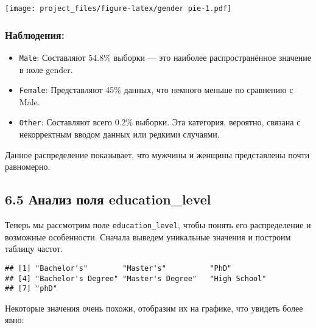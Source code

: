 \documentclass[
]{article}
\newenvironment{Shaded}{\begin{snugshade}}{\end{snugshade}}
\newcommand{\FunctionTok}[1]{\textcolor[rgb]{0.13,0.29,0.53}{\textbf{#1}}}
\newcommand{\NormalTok}[1]{#1}
\newcommand{\SpecialCharTok}[1]{\textcolor[rgb]{0.81,0.36,0.00}{\textbf{#1}}}
\providecommand{\tightlist}{%
  \setlength{\itemsep}{0pt}\setlength{\parskip}{0pt}}
\begin{document}
\texttt{[image: project\_files/figure-latex/gender pie-1.pdf]}

\subsubsection{Наблюдения:}\label{ux43dux430ux431ux43bux44eux434ux435ux43dux438ux44f-4}

\begin{itemize}
\tightlist
\item
  \texttt{Male}: Составляют 54.8\% выборки --- это наиболее
  распространённое значение в поле gender.
\item
  \texttt{Female}: Представляют 45\% данных, что немного меньше по
  сравнению с Male.
\item
  \texttt{Other}: Составляют всего 0.2\% выборки. Эта категория,
  вероятно, связана с некорректным вводом данных или редкими случаями.
\end{itemize}

Данное распределение показывает, что мужчины и женщины представлены
почти равномерно.

\subsection{6.5 Анализ поля
education\_level}\label{ux430ux43dux430ux43bux438ux437-ux43fux43eux43bux44f-education_level}

Теперь мы рассмотрим поле \texttt{education\_level}, чтобы понять его
распределение и возможные особенности. Сначала выведем уникальные
значения и построим таблицу частот.

\begin{Shaded}
\end{Shaded}

\begin{verbatim}
## [1] "Bachelor's"        "Master's"          "PhD"              
## [4] "Bachelor's Degree" "Master's Degree"   "High School"      
## [7] "phD"
\end{verbatim}

Некоторые значения очень похожи, отобразим их на графике, что увидеть
более явно:
\end{document}
